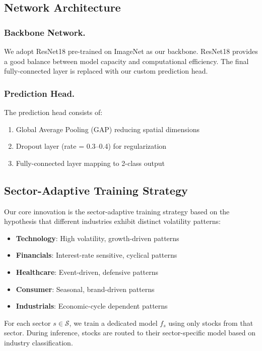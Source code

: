 \documentclass[runningheads]{llncs}
\begin{document}
\subsection{Network Architecture}
\label{sec:architecture}

\subsubsection{Backbone Network.}
We adopt ResNet18 \cite{He16} pre-trained on ImageNet as our backbone. ResNet18 provides a good balance between model capacity and computational efficiency. The final fully-connected layer is replaced with our custom prediction head.

\subsubsection{Prediction Head.}
The prediction head consists of:
\begin{enumerate}
    \item Global Average Pooling (GAP) reducing spatial dimensions
    \item Dropout layer (rate = 0.3--0.4) for regularization
    \item Fully-connected layer mapping to 2-class output
\end{enumerate}

\subsection{Sector-Adaptive Training Strategy}
\label{sec:sector}

Our core innovation is the sector-adaptive training strategy based on the hypothesis that different industries exhibit distinct volatility patterns:

\begin{itemize}
    \item \textbf{Technology}: High volatility, growth-driven patterns
    \item \textbf{Financials}: Interest-rate sensitive, cyclical patterns
    \item \textbf{Healthcare}: Event-driven, defensive patterns
    \item \textbf{Consumer}: Seasonal, brand-driven patterns
    \item \textbf{Industrials}: Economic-cycle dependent patterns
\end{itemize}

For each sector $s \in \mathcal{S}$, we train a dedicated model $f_s$ using only stocks from that sector. During inference, stocks are routed to their sector-specific model based on industry classification.
\end{document}
